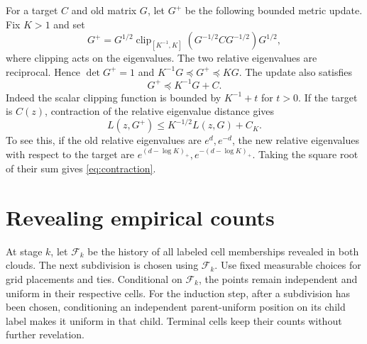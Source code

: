 \documentclass[11pt]{article}
\begin{document}
For a target \(C\) and old matrix \(G\), let \(G^+\) be the
following bounded metric update. Fix \(K>1\) and set
\[
 G^+=G^{1/2}\operatorname{clip}_{[K^{-1},K]}
                (G^{-1/2}CG^{-1/2})G^{1/2},
\]
where clipping acts on the eigenvalues.
The two relative eigenvalues are reciprocal. Hence
\(\det G^+=1\) and \(K^{-1}G\preceq G^+\preceq K G\).
The update also satisfies
\begin{equation}\label{eq:clip}
 G^+\preceq K^{-1}G+C.
\end{equation}
Indeed the scalar clipping function is bounded by \(K^{-1}+t\)
for \(t>0\). If the target is \(C(z)\), contraction of the
relative eigenvalue distance gives
\begin{equation}\label{eq:contraction}
 L(z,G^+)\le K^{-1/2}L(z,G)+C_K .
\end{equation}
To see this, if the old relative eigenvalues are \(e^d,e^{-d}\),
the new relative eigenvalues with respect to the target are
\(e^{(d-\log K)_+},e^{-(d-\log K)_+}\). Taking the square root of
their sum gives \eqref{eq:contraction}.

\section{Revealing empirical counts}\label{sec:reveal}

At stage \(k\), let \(\mathcal F_k\) be the history of all labeled
cell memberships revealed in both clouds. The next subdivision
is chosen using \(\mathcal F_k\). Use fixed measurable choices
for grid placements and ties. Conditional on \(\mathcal F_k\),
the points remain independent and uniform in their respective
cells. For the induction step, after a subdivision has been
chosen, conditioning an independent parent-uniform position on
its child label makes it uniform in that child.
Terminal cells keep their counts without further revelation.
\end{document}
